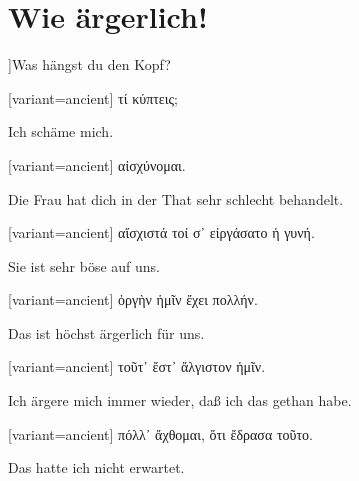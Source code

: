 \section{Wie ärgerlich!}

]Was hängst du den Kopf? 

\switchcolumn

\begin{greek}[variant=ancient]%
τί κύπτεις;

\end{greek}%
\switchcolumn*

Ich schäme mich. 

\switchcolumn

\begin{greek}[variant=ancient]%
αἰσχύνομαι.

\end{greek}%
\switchcolumn*

Die Frau hat dich in der That sehr schlecht behandelt. 

\switchcolumn

\begin{greek}[variant=ancient]%
αἴσχιστά τοί σ᾽ εἰργάσατο ἡ γυνή.

\end{greek}%
\switchcolumn*

Sie ist sehr böse auf uns. 

\switchcolumn

\begin{greek}[variant=ancient]%
ὀργὴν ἡμῖν ἔχει πολλήν.

\end{greek}%
\switchcolumn*

Das ist höchst ärgerlich für uns. 

\switchcolumn

\begin{greek}[variant=ancient]%
τοῦτ᾽ ἔστ᾽ ἄλγιστον ἡμῖν.

\end{greek}%
\switchcolumn*

Ich ärgere mich immer wieder, daß ich das gethan habe. 

\switchcolumn

\begin{greek}[variant=ancient]%
πόλλ᾽ ἄχθομαι, ὅτι ἔδρασα τοῦτο.

\end{greek}%
\switchcolumn*

Das hatte ich nicht erwartet. 

\switchcolumn

